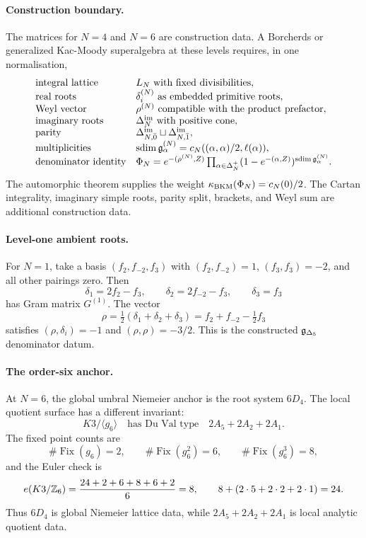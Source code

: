 \paragraph{Construction boundary.}
The matrices for $N=4$ and $N=6$ are construction data. A Borcherds or
generalized Kac-Moody superalgebra at these levels requires, in one
normalisation,
\[
\begin{array}{ll}
\text{integral lattice} & L_N\ \text{with fixed divisibilities},\\
\text{real roots} & \delta_i^{(N)}\ \text{as embedded primitive roots},\\
\text{Weyl vector} & \rho^{(N)}\ \text{compatible with the product
prefactor},\\
\text{imaginary roots} & \Delta^{\mathrm{im}}_N\ \text{with positive cone},\\
\text{parity} & \Delta^{\mathrm{im}}_{N,\bar0}\sqcup
  \Delta^{\mathrm{im}}_{N,\bar1},\\
\text{multiplicities} &
  \operatorname{sdim}\mathfrak{g}^{(N)}_{\alpha}
  =c_N((\alpha,\alpha)/2,\ell(\alpha)),\\
\text{denominator identity} &
  \Phi_N=e^{-(\rho^{(N)},Z)}
  \prod_{\alpha\in\Delta_N^+}(1-e^{-(\alpha,Z)})^{
  \operatorname{sdim}\mathfrak{g}^{(N)}_{\alpha}} .
\end{array}
\]
The automorphic theorem supplies the weight
$\kappa_{\mathrm{BKM}}(\Phi_N)=c_N(0)/2$. The Cartan integrality, imaginary simple
roots, parity split, brackets, and Weyl sum are additional construction
data.

\paragraph{Level-one ambient roots.}
For $N=1$, take a basis $(f_2,f_{-2},f_3)$ with
$(f_2,f_{-2})=1$, $(f_3,f_3)=-2$, and all other pairings zero. Then
\[
  \delta_1=2f_2-f_3,\qquad
  \delta_2=2f_{-2}-f_3,\qquad
  \delta_3=f_3
\]
has Gram matrix $G^{(1)}$. The vector
\[
  \rho=\tfrac12(\delta_1+\delta_2+\delta_3)
       =f_2+f_{-2}-\tfrac12f_3
\]
satisfies $(\rho,\delta_i)=-1$ and
$(\rho,\rho)=-3/2$. This is the constructed
$\mathfrak{g}_{\Delta_5}$ denominator datum.

\paragraph{The order-six anchor.}
At $N=6$, the global umbral Niemeier anchor is the root system $6D_4$.
The local quotient surface has a different invariant:
\[
  K3/\langle g_6\rangle
  \quad\text{has Du Val type}\quad
  2A_5+2A_2+2A_1.
\]
The fixed point counts are
\[
  \#\operatorname{Fix}(g_6)=2,\qquad
  \#\operatorname{Fix}(g_6^2)=6,\qquad
  \#\operatorname{Fix}(g_6^3)=8,
\]
and the Euler check is
\[
  e(K3/\mathbb{Z}_6)=\frac{24+2+6+8+6+2}{6}=8,\qquad
  8+(2\cdot5+2\cdot2+2\cdot1)=24.
\]
Thus $6D_4$ is global Niemeier lattice data, while
$2A_5+2A_2+2A_1$ is local analytic quotient data.

